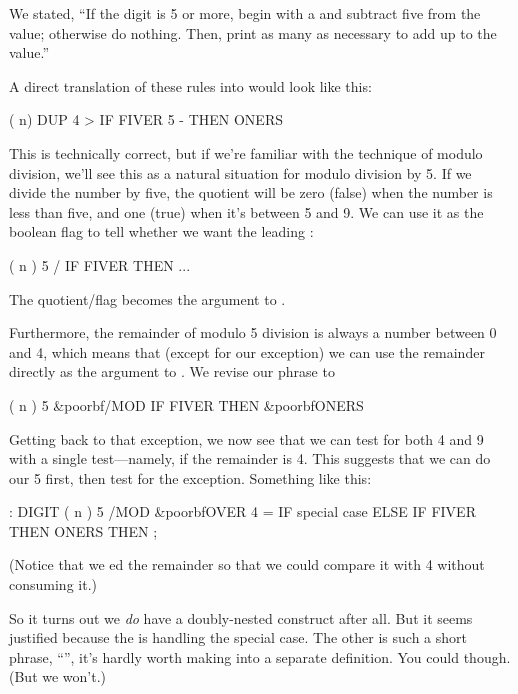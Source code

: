 We stated, ``If the digit is 5 or more, begin with a  and
subtract five from the value; otherwise do nothing. Then, print as many
 as necessary to add up to the value.''

A direct translation of these rules into \Forth{} would look like this:

\begin{Code}
( n)  DUP  4 > IF  FIVER 5 -  THEN  ONERS
\end{Code}
This is technically correct, but if we're familiar with the technique of
modulo division, we'll see this as a natural situation for modulo division
by 5. If we divide the number by five, the quotient will be zero (false)
when the number is less than five, and one (true) when it's between 5 and
9. We can use it as the boolean flag to tell whether we want the leading
:

\begin{Code}
( n )  5 / IF FIVER THEN ...
\end{Code}
The quotient/flag becomes the argument to .

Furthermore, the remainder of modulo 5 division is always a number between
0 and 4, which means that (except for our exception) we can use the
remainder directly as the argument to . We revise our phrase
to

\begin{Code}[commandchars=\&\{\}]
( n )  5 &poorbf{/MOD} IF FIVER THEN  &poorbf{ONERS}
\end{Code}
Getting back to that exception, we now see that we can test for both 4 and
9 with a single test---namely, if the remainder is 4. This suggests that
we can do our 5  first, then test for the exception.
Something like this:

\begin{Code}[commandchars=\&\{\}]
: DIGIT  ( n )
     5 /MOD  &poorbf{OVER 4 =  IF  special case  ELSE}
     IF FIVER THEN  ONERS  THEN ;
\end{Code}
(Notice that we ed the remainder so that we could compare it with
4 without consuming it.)

So it turns out we \emph{do} have a doubly-nested 
construct after all. But it seems justified because the 
is handling the special case. The other is such a short phrase,
``'', it's hardly worth making into a separate
definition. You could though. (But we won't.)

